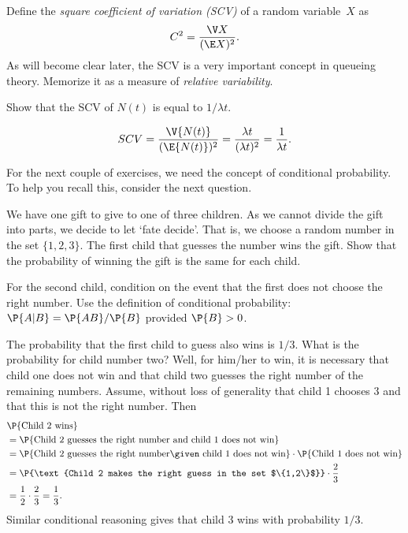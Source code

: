 Define the \emph{square coefficient  of variation (SCV)} of a random variable~$X$ as 
\begin{equation*}
  C^2= \frac{\V X}{(\E X)^2}.
\end{equation*}
As  will become clear later, the SCV is a very important concept in
  queueing theory. Memorize it as a measure of \emph{relative
  variability}.

\begin{exercise}
Show that   the SCV of $N(t)$ is equal to $1/\lambda t$. 
  \begin{solution}
    \begin{equation*}
SCV = \frac{\V{N(t)}}{(\E{N(t)})^2} = \frac{\lambda t}{(\lambda t)^2} = \frac1{\lambda t}.
    \end{equation*}

  \end{solution}
\end{exercise}

For the next couple of exercises, we need the concept of conditional probability. To help you recall this, consider the next question.

\begin{exercise} \label{ex:18}
  We have  one gift to give to one of three children. As we cannot
  divide the gift into parts, we decide to let `fate decide'. That
  is, we choose a random number in the set $\{1, 2, 3\}$. The first
  child that guesses the number wins the gift. Show that the
  probability of winning the gift is the same for each child.
  \begin{hint}
    For the second child, condition on the event that the first does not choose the right number.
    Use the definition of conditional probability:
    $\P{A|B} = \P{AB}/\P{B}$ provided $\P{B}>0$.
  \end{hint}
\begin{solution}
    The probability that the first child to guess also wins is
    $1/3$. What is the probability for child number two? Well, for
    him/her to win, it is necessary that child one does not win and
    that child two guesses the right number of the remaining
    numbers. Assume, without loss of generality that child 1 chooses
    $3$ and that this is not the right number. Then 
    \begin{equation*}
      \begin{split}
&\P{\text{Child  2 wins}} \\
&= \P{\text{Child 2 guesses the right number and child 1 does not win}} \\
&= \P{\text{Child 2 guesses the right number} \given \text{ child 1 does not win}}
\cdot \P{\text{Child 1 does not win}} \\
&= \P{\text{Child 2 makes the right guess in the set $\{1,2\}$}}\cdot \frac 23 \\
&= \frac 1 2\cdot \frac 23  = \frac 1 3.
      \end{split}
    \end{equation*}
    Similar conditional reasoning gives that child 3 wins with probability $1/3$. 
  \end{solution}
\end{exercise}

